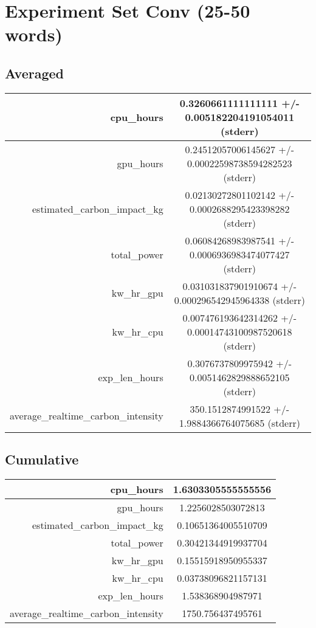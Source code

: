 \documentclass{article}%
\begin{document}
%
\normalsize%
\section{Experiment Set Conv (25{-}50 words)}%
\label{sec:Experiment Set Conv (25{-}50 words)}%
\subsection{Averaged}%
\label{subsec:Averaged}%
\begin{tabular}{|r|c|}%
\hline%
cpu\_hours&0.3260661111111111 +/{-} 0.005182204191054011 (stderr)\\%
\hline%
gpu\_hours&0.24512057006145627 +/{-} 0.00022598738594282523 (stderr)\\%
\hline%
estimated\_carbon\_impact\_kg&0.02130272801102142 +/{-} 0.0002688295423398282 (stderr)\\%
\hline%
total\_power&0.06084268983987541 +/{-} 0.0006936983474077427 (stderr)\\%
\hline%
kw\_hr\_gpu&0.031031837901910674 +/{-} 0.000296542945964338 (stderr)\\%
\hline%
kw\_hr\_cpu&0.007476193642314262 +/{-} 0.00014743100987520618 (stderr)\\%
\hline%
exp\_len\_hours&0.3076737809975942 +/{-} 0.0051462829888652105 (stderr)\\%
\hline%
average\_realtime\_carbon\_intensity&350.1512874991522 +/{-} 1.9884366764075685 (stderr)\\%
\hline%
\end{tabular}

%
\subsection{Cumulative}%
\label{subsec:Cumulative}%
\begin{tabular}{|r|c|}%
\hline%
cpu\_hours&1.6303305555555556\\%
\hline%
gpu\_hours&1.2256028503072813\\%
\hline%
estimated\_carbon\_impact\_kg&0.10651364005510709\\%
\hline%
total\_power&0.30421344919937704\\%
\hline%
kw\_hr\_gpu&0.15515918950955337\\%
\hline%
kw\_hr\_cpu&0.03738096821157131\\%
\hline%
exp\_len\_hours&1.538368904987971\\%
\hline%
average\_realtime\_carbon\_intensity&1750.756437495761\\%
\hline%
\end{tabular}

%
\end{document}
